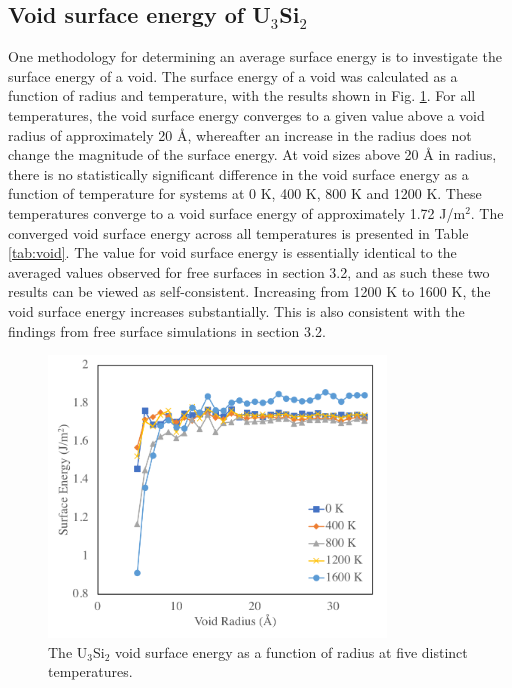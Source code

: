 \documentclass[review]{elsarticle}
\begin{document}
\FloatBarrier

\subsection{Void surface energy of U$_{3}$Si$_{2}$}

One methodology for determining an average surface energy is to investigate the surface energy of a void. The surface energy of a void was calculated as a function of radius and temperature, with the results shown in Fig. \ref{fig:void}. For all temperatures, the void surface energy converges to a given value above a void radius of approximately 20 {\AA}, whereafter an increase in the radius does not change the magnitude of the surface energy. At void sizes above 20 {\AA} in radius, there is no statistically significant difference in the void surface energy as a function of temperature for systems at 0 K, 400 K, 800 K and 1200 K. These temperatures converge to a void surface energy of approximately 1.72 J/m$^{2}$. The converged void surface energy across all temperatures is presented in Table \ref{tab:void}. The value for void surface energy is essentially identical to the averaged values observed for free surfaces in section 3.2, and as such these two results can be viewed as self-consistent. Increasing from 1200 K to 1600 K, the void surface energy increases substantially. This is also consistent with the findings from free surface simulations in section 3.2. 

\begin{figure}[h]
 \centering
 \includegraphics[width=0.8\textwidth]{void_vs_rc.png} 
 \caption{The U$_{3}$Si$_{2}$ void surface energy as a function of radius at five distinct temperatures. }
 \label{fig:void}
\end{figure}
\end{document}
